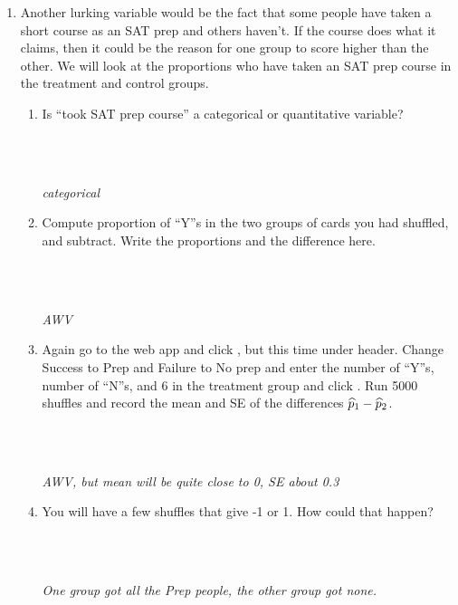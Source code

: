 \begin{enumerate}
\item Another lurking variable would be the fact that some people have
  taken a short course as an SAT prep and others haven't.  If the
  course does what it claims, then it could be the reason for one
  group to score higher than the other. We will look at the
  proportions who have taken an SAT prep course in the treatment and
  control groups.  
  \begin{enumerate}
  \item Is ``took SAT prep course'' a categorical or quantitative
    variable? 
\begin{students}
        \vspace{1cm}\\
\end{students}
\begin{key}
  \\ {\it categorical}
\end{key}

    \item Compute proportion of ``Y''s in the two groups of cards you
      had shuffled, and subtract.  Write the proportions and the
      difference here.
\begin{students}
        \vspace{1cm}\\
\end{students}
\begin{key}
  \\ {\it  AWV}
\end{key}

    \item Again go to the  web app and click , but
      this time under  header.  Change {\sf Success}
      to {\sf Prep} and {\sf Failure} to {\sf No prep} and enter the
      number of ``Y''s, number of ``N''s, and 6 in the treatment group
      and click .  Run 5000 shuffles and record the mean and
      SE of the differences $\widehat{p}_1 - \widehat{p}_2$.
\begin{students}
        \vspace{1cm}\\
\end{students}
\begin{key}
  \\ {\it AWV, but mean will be quite close to 0, SE about 0.3}
\end{key}
    \item You will have a few shuffles that give -1 or 1.  How could
      that happen? 
\begin{students}
        \vspace{1cm}\\
\end{students}
\begin{key}
  \\ {\it  One group got all the Prep people, the other group got none.}
\end{key}
 

\end{enumerate}
\end{enumerate}
